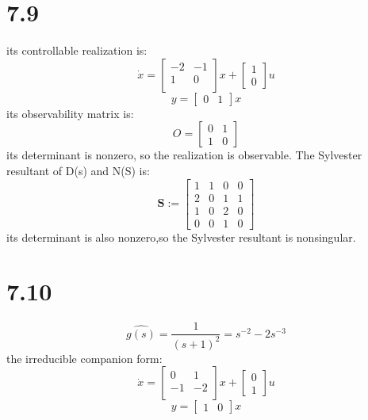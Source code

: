 \documentclass{article}
\begin{document}
\section*{7.9}
its controllable realization is:
\[
\dot{x}=
\left[
\begin{array}{cc}
-2 & -1\\
1 & 0\\
\end{array}    
\right]x+
\left[
    \begin{array}{c}
    1\\
    0
    \end{array}
\right]u
\]
\[
    y=\left[
        \begin{array}{cc}
            0 & 1
        \end{array}
        \right]x    
\]
its observability matrix is:
\[
    O=\left[
        \begin{array}{cc}
            0 & 1\\
            1 & 0
        \end{array}
    \right]      
\]
its determinant is nonzero, so the realization is observable.
The Sylvester resultant of D(s) and N(S) is:
\[
    \textbf{S}:=
    \left[
        \begin{array}{cccc}
            1 & 1 & 0 &0\\
            2 & 0 & 1 & 1\\
            1 & 0 &2 & 0\\
            0 & 0 & 1& 0
        \end{array}
    \right]
\]
its determinant is also nonzero,so the Sylvester resultant is nonsingular.

\section*{7.10}
\[
\hat{g(s)}=\frac{1}{(s+1)^2}=s^{-2}-2s^{-3}
\]
the irreducible companion form:
\[
\dot{x}=
\left[
\begin{array}{cc}
0 & 1\\
-1 & -2\\
\end{array}    
\right]x+
\left[
    \begin{array}{c}
    0\\
    1
    \end{array}
\right]u
\]
\[
    y=\left[
        \begin{array}{cc}
            1 & 0
        \end{array}
        \right]x    
\]
\end{document}
